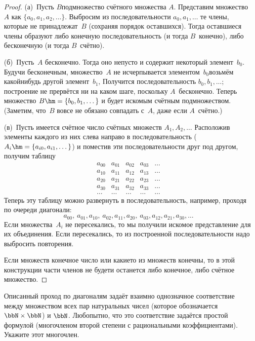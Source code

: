 \begin{proof}
(а)~Пусть $B$\т подмножество счётного множества $A$. Представим
множество $A$ как $\{a_0,a_1,a_2,\dots\}$. Выбросим из
последовательности $a_0, a_1, \dots$ те члены, которые не
принадлежат~$B$ (сохраняя порядок оставшихся). Тогда оставшиеся
члены образуют либо конечную последовательность (и тогда
$B$~конечно), либо бесконечную (и тогда $B$~счётно).

(б)~Пусть~$A$ бесконечно. Тогда оно непусто и
содержит некоторый
элемент~$b_0$. Будучи бесконечным, множество~$A$ не исчерпывается
элементом~$b_0$\т возьмём какой\д нибудь другой элемент~$b_1$, 
Получится последовательность $b_0, b_1, \dots$;
построение не прервётся ни на каком шаге, поскольку $A$~бесконечно.
Теперь множество
$B\hm=\{b_0,b_1,\dots\}$ и будет искомым счётным
подмножеством. (Заметим, что~$B$ вовсе не обязано совпадать
с~$A$, даже если $A$~счётно.)

(в)~Пусть имеется счётное число счётных множеств
$A_1, A_2, \dots$ Расположив элементы каждого из них слева направо в
последовательность ($A_i\hm=\{a_{i0},a_{i1},\dots\}$) и
поместив эти последовательности друг под другом, получим
таблицу
        $$
        \begin{array}{ccccc}
   a_{00} & a_{01} & a_{02} & a_{03} & \ldots \\
   a_{10} & a_{11} & a_{12} & a_{13} & \ldots \\
   a_{20} & a_{21} & a_{22} & a_{23} & \ldots \\
   a_{30} & a_{31} & a_{32} & a_{33} & \ldots \\
   \ldots & \ldots & \ldots & \ldots & \ldots
        \end{array}
        $$
Теперь эту таблицу можно развернуть в последовательность,
например, проходя по очереди диагонали:
    $$
        a_{00},\ a_{01}, a_{10}, \
        a_{02}, a_{11}, a_{20}, \
        a_{03}, a_{12}, a_{21}, a_{30}, \ldots
    $$
Если множества~$A_i$ не пересекались, то мы получили искомое
представление для их объединения. Если пересекались, то из
построенной последовательности надо выбросить повторения.

Если множеств конечное число или какие\д то из множеств конечны,
то в этой конструкции части членов не будет\т и
останется либо конечное, либо счётное множество.
\end{proof}

\begin{problem}
Описанный
проход по диагоналям задаёт взаимно
однозначное соответствие между множеством всех пар натуральных
чисел (которое обозначается $\bbN\times\bbN$) и $\bbN$.
Любопытно, что это соответствие
задаётся простой формулой
(многочленом второй степени с рациональными коэффициентами).
Укажите этот многочлен.
\end{problem}

